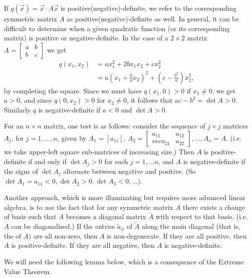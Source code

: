 If $q(\vec{x}) = \vec{x}\cdot A\vec{x}$ is positive(negative)-definite, we refer to the corresponding symmetric matrix $A$ as positive(negative)-definite as well. In general, it can be difficult to determine when a given quadratic function (or its corresponding matrix) is positive or negative-definite. In the case of a $2\times 2$ matrix $A = \begin{bmatrix} a&b\\b&c\end{bmatrix}$ we get
\begin{align*}
q(x_1,x_2)&= ax_1^2+2bx_1x_2+cx_2^2\\
&=a\left(x_1+\frac{b}{a}x_2\right)^2+\left(c-\frac{b^2}{a}\right)x_2^2,
\end{align*}
by completing the square. Since we must have $q(x_1,0)>0$ if $x_1\neq 0$, we get $a>0$, and since $q(0,x_2)>0$ for $x_2\neq 0$, it follows that $ac-b^2=\det A >0$. Similarly $q$ is negative-definite if $a<0$ and $\det A>0$.

For an $n\times n$ matrix, one test is as follows: consider the sequence of $j\times j$ matrices $A_j$, for $j=1,\ldots , n$, given by  $A_1=[a_{11}]$, $A_2 = \begin{bmatrix} a_{11}&a_{12}\\vec{a}_{21}&a_{22}\end{bmatrix},\ldots, A_n=A$. (i.e. we take upper-left square sub-matrices of increasing size.) Then $A$ is positive-definite if and only if $\det A_j>0$ for each $j=1,\ldots n$, and $A$ is negative-definite if the signs of $\det A_j$ alternate between negative and positive. (So $\det A_1 = a_{11}<0, \det A_2>0, \det A_3<0,\ldots$).

Another approach, which is more illuminating but requires more advanced linear algebra, is to use the fact that for any symmetric matrix $A$ there exists a change of basis such that $A$ becomes a diagonal matrix $\tilde{A}$ with respect to that basis. (i.e. $A$ can be diagonalized.) If the entries $\tilde{a}_{ii}$ of $\tilde{A}$ along the main diagonal (that is, the  of $A$) are all non-zero, then $A$ is non-degenerate. If they are all positive, then $A$ is positive-definite. If they are all negative, then $A$ is negative-definite.

We will need the following lemma below, which is a consequence of the Extreme Value Theorem.


